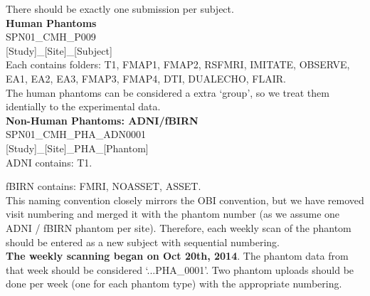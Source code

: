 \documentclass[a4paper,11pt,oneside]{book}
\newcommand\stepsL{
    \noindent
    \leftskip=0.15in
    \small
}
\newcommand\namingL{
    \small
    \noindent
    \leftskip=0in
    \textbf
}
\newcommand\namingexampleL{
    \noindent
    \leftskip=0.15in
    \small
}
\begin{document}
\begin{multicols}{2}
{\stepsL{There should be exactly one submission per subject.}\\



\namingL{Human Phantoms} \\
\namingexampleL{SPN01\_CMH\_P009}\\
\namingexampleL{[Study]\_[Site]\_[Subject]}\\

\stepsL{Each contains folders: T1, FMAP1, FMAP2, RSFMRI, IMITATE, OBSERVE, EA1, EA2, EA3, FMAP3, FMAP4, DTI, DUALECHO, FLAIR.}\\

\stepsL{The human phantoms can be considered a extra `group', so we treat them identially to the experimental data.}\\

\namingL{Non-Human Phantoms: ADNI/fBIRN}\\ 
\namingexampleL{SPN01\_CMH\_PHA\_ADN0001}\\
\namingexampleL{[Study]\_[Site]\_PHA\_[Phantom]}\\

\stepsL{ADNI contains: T1.} \

\stepsL{fBIRN contains: FMRI, NOASSET, ASSET.} \\

\stepsL{This naming convention closely mirrors the OBI convention, but we have removed visit numbering and merged it with the phantom number (as we assume one ADNI / fBIRN phantom per site). Therefore, each weekly scan of the phantom should be entered as a new subject with sequential numbering.}\\

\stepsL{\textbf{The weekly scanning began on Oct 20th, 2014}. The phantom data from that week should be considered `...PHA\_0001'. Two phantom uploads should be done per week (one for each phantom type) with the appropriate numbering.}

}
\end{multicols}
\end{document}
